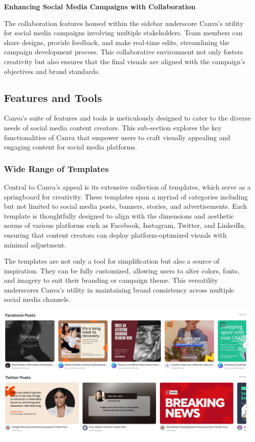 \documentclass[
]{book}
\begin{document}
\textbf{Enhancing Social Media Campaigns with Collaboration}

The collaboration features housed within the sidebar underscore Canva's utility for social media campaigns involving multiple stakeholders. Team members can share designs, provide feedback, and make real-time edits, streamlining the campaign development process. This collaborative environment not only fosters creativity but also ensures that the final visuals are aligned with the campaign's objectives and brand standards.

\hypertarget{features-and-tools}{%
\subsection*{Features and Tools}\label{features-and-tools}}

Canva's suite of features and tools is meticulously designed to cater to the diverse needs of social media content creators. This sub-section explores the key functionalities of Canva that empower users to craft visually appealing and engaging content for social media platforms.

\hypertarget{wide-range-of-templates}{%
\subsubsection*{Wide Range of Templates}\label{wide-range-of-templates}}

Central to Canva's appeal is its extensive collection of templates, which serve as a springboard for creativity. These templates span a myriad of categories including but not limited to social media posts, banners, stories, and advertisements. Each template is thoughtfully designed to align with the dimensions and aesthetic norms of various platforms such as Facebook, Instagram, Twitter, and LinkedIn, ensuring that content creators can deploy platform-optimized visuals with minimal adjustment.

The templates are not only a tool for simplification but also a source of inspiration. They can be fully customized, allowing users to alter colors, fonts, and imagery to suit their branding or campaign theme. This versatility underscores Canva's utility in maintaining brand consistency across multiple social media channels.

\href{https://www.canva.com/templates/}{\includegraphics[width=1\textwidth,height=\textheight]{images/clipboard-143261966.png}}
\end{document}
